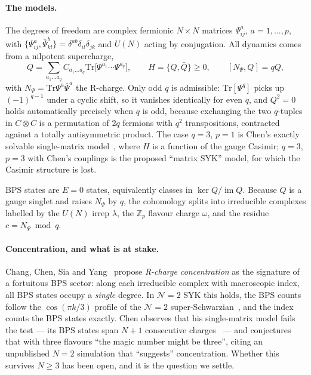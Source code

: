 \documentclass[10pt]{article}
\newcommand{\Tr}{\mathrm{Tr}}
\newcommand{\bPsi}{\bar\Psi}
\newcommand{\bQ}{\bar Q}
\begin{document}
\paragraph{The models.}
The degrees of freedom are complex fermionic $N\times N$ matrices $\Psi^a_{ij}$, $a=1,\dots,p$, with $\{\Psi^a_{ij},\bPsi^b_{kl}\}=\delta^{ab}\delta_{il}\delta_{jk}$ and $U(N)$ acting by conjugation. All dynamics comes from a nilpotent supercharge,
\begin{equation}
Q=\sum_{a_1\dots a_q}C_{a_1\dots a_q}\Tr\!\big[\Psi^{a_1}\!\cdots\Psi^{a_q}\big],\qquad H=\{Q,\bQ\}\ge0,\qquad [N_\Psi,Q]=qQ ,
\label{eq:Q}
\end{equation}
with $N_\Psi=\Tr\Psi^a\bPsi^a$ the R-charge. Only odd $q$ is admissible: $\Tr[\Psi^q]$ picks up $(-1)^{q-1}$ under a cyclic shift, so it vanishes identically for even $q$, and $Q^2=0$ holds automatically precisely when $q$ is odd, because exchanging the two $q$-tuples in $C\otimes C$ is a permutation of $2q$ fermions with $q^2$ transpositions, contracted against a totally antisymmetric product. The case $q=3$, $p=1$ is Chen's exactly solvable single-matrix model~\cite{Chen:2025fortuity}, where $H$ is a function of the gauge Casimir; $q=3$, $p=3$ with Chen's couplings is the proposed ``matrix SYK'' model, for which the Casimir structure is lost.

BPS states are $E=0$ states, equivalently classes in $\ker Q/\operatorname{im}Q$. Because $Q$ is a gauge singlet and raises $N_\Psi$ by $q$, the cohomology splits into irreducible complexes labelled by the $U(N)$ irrep $\lambda$, the $\mathbb Z_p$ flavour charge $\omega$, and the residue $c=N_\Psi \bmod q$.

\paragraph{Concentration, and what is at stake.}
Chang, Chen, Sia and Yang~\cite{Chang:2024fortuitySYK} propose \emph{R-charge concentration} as the signature of a fortuitous BPS sector: along each irreducible complex with macroscopic index, all BPS states occupy a \emph{single} degree. In $\mathcal N=2$ SYK this holds, the BPS counts follow the $\cos(\pi k/3)$ profile of the $\mathcal N=2$ super-Schwarzian~\cite{Turiaci:2023N2JT,Fu:2016SUSYSYK}, and the index counts the BPS states exactly. Chen observes that his single-matrix model fails the test --- its BPS states span $N+1$ consecutive charges~\cite[(2.22)]{Chen:2025fortuity} --- and conjectures that with three flavours ``the magic number might be three'', citing an unpublished $N=2$ simulation that ``suggests'' concentration. Whether this survives $N\ge3$ has been open, and it is the question we settle.
\end{document}
